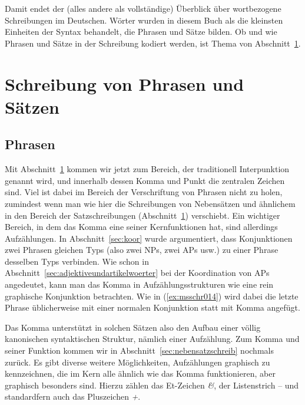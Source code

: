 Damit endet der (alles andere als vollständige) Überblick über wortbezogene Schreibungen im Deutschen.
Wörter wurden in diesem Buch als die kleinsten Einheiten der Syntax behandelt, die Phrasen und Sätze bilden.
Ob und wie Phrasen und Sätze in der Schreibung kodiert werden, ist Thema von Abschnitt~\ref{sec:satzschreib}.

\section{Schreibung von Phrasen und Sätzen}

\label{sec:satzschreib}

\subsection{Phrasen}

\label{sec:phrasenschrift}
\label{sec:koordinschreib}

Mit Abschnitt~\ref{sec:satzschreib} kommen wir jetzt zum Bereich, der traditionell Interpunktion genannt wird, und innerhalb dessen Komma und Punkt die zentralen Zeichen sind.
Viel ist dabei im Bereich der Verschriftung von Phrasen nicht zu holen, zumindest wenn man wie hier die Schreibungen von Nebensätzen und ähnlichem in den Bereich der Satzschreibungen (Abschnitt~\ref{sec:satzschreib}) verschiebt.
Ein wichtiger Bereich, in dem das Komma eine seiner Kernfunktionen hat, sind allerdings Aufzählungen.
In Abschnitt~\ref{sec:koor} wurde argumentiert, dass Konjunktionen zwei Phrasen gleichen Typs (also zwei NPs, zwei APs usw.) zu einer Phrase desselben Typs verbinden.
Wie schon in Abschnitt~\ref{sec:adjektiveundartikelwoerter} bei der Koordination von APs angedeutet, kann man das Komma in Aufzählungsstrukturen wie eine rein graphische Konjunktion betrachten.
Wie in (\ref{ex:msschr014}) wird dabei die letzte Phrase üblicherweise mit einer normalen Konjunktion statt mit Komma angefügt.

\begin{exe}
\end{exe}

Das Komma unterstützt in solchen Sätzen also den Aufbau einer völlig kanonischen syntaktischen Struktur, nämlich einer Aufzählung.
Zum Komma und seiner Funktion kommen wir in Abschnitt~\ref{sec:nebensatzschreib} nochmals zurück.
Es gibt diverse weitere Möglichkeiten, Aufzählungen graphisch zu kennzeichnen, die im Kern alle ähnlich wie das Komma funktionieren, aber graphisch besonders sind.
Hierzu zählen das Et-Zeichen \textit{\&}, der Listenstrich -- und standardfern auch das Pluszeichen \textit{+}.

